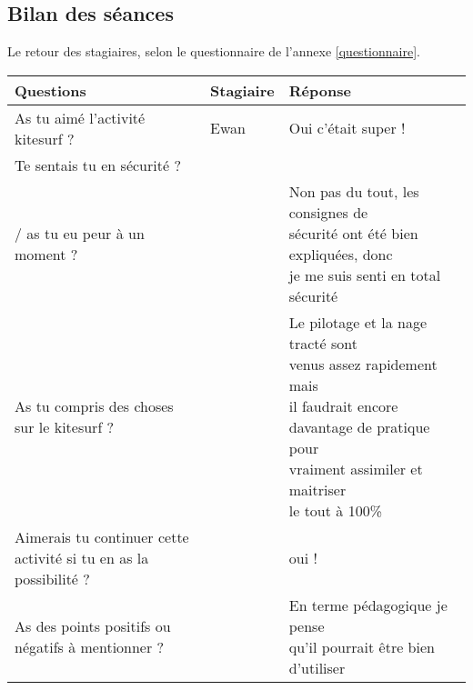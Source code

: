 \documentclass[12pt,a4paper]{report}
\begin{document}
\subsection{Bilan des séances}
Le retour des stagiaires, selon le questionnaire de l'annexe \ref{questionnaire}.
\begin{table}
\begin{tabular}{|p{6cm}|p{1.6cm}|p{7cm}|}
        \hline
        \textbf{\small{Questions}}           & \textbf{\small{Stagiaire}} & \textbf{\small{Réponse}}   \\ 
        \hline
  As tu aimé l'activité kitesurf ?           & Ewan                       & Oui c'était super !   \\
        \hline
        Te sentais tu en sécurité ? \\
        / as tu eu peur à un moment ?    &     & \shortstack{Non pas du tout, les consignes de  \\
                                         sécurité ont été bien expliquées, donc\\je me suis senti en total sécurité} \\
        \hline
        As tu compris des choses sur le kitesurf ? & &  \shortstack{Le pilotage et la nage tracté sont  \\    
                                                                    venus assez rapidement mais \\
                                                                     il faudrait encore \\
                                                                    davantage de pratique pour \\
                                                               vraiment assimiler et maitriser \\
                                                                 le tout à 100\%}\\
        \hline
\shortstack{Aimerais tu continuer cette \\ 
         activité si tu en as la  \\
                                     possibilité ?}          & &oui ! \\
         \hline
\shortstack{As des points positifs ou \\
 négatifs  à mentionner ?}                                 & & \shortstack{En terme pédagogique je pense \\
                                                                        qu'il pourrait \^etre bien d'utiliser \\
}
\end{tabular}
\end{table}
\end{document}
